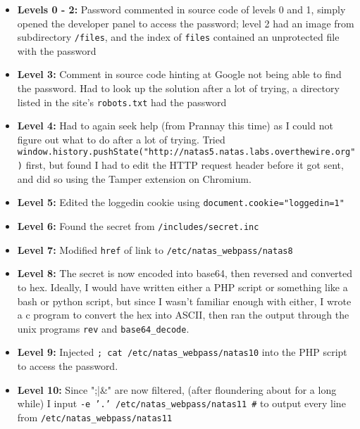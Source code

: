 \documentclass{article}
\def\code#1{\texttt{#1}}
\begin{document}
\begin{itemize}
    
    \item \textbf{Levels 0 - 2: } Password commented in source code of levels 0 and 1, simply opened the developer panel to access the password; level 2 had an image from subdirectory \code{/files}, and the index of \code{files} contained an unprotected file with the password
    
    \item \textbf{Level 3: } Comment in source code hinting at Google not being able to find the password. Had to look up the solution after a lot of trying, a directory listed in the site's \code{robots.txt} had the password
    
    \item \textbf{Level 4: } Had to again seek help (from Prannay this time) as I could not figure out what to do after a lot of trying. Tried \code{window.history.pushState("http://natas5.natas.labs.overthewire.org")} first, but found I had to edit the HTTP request header before it got sent, and did so using the Tamper extension on Chromium.
    
    \item \textbf{Level 5: } Edited the loggedin cookie using \code{document.cookie="loggedin=1"}
    
    \item \textbf{Level 6: } Found the secret from \code{/includes/secret.inc}
    
    \item \textbf{Level 7: } Modified \code{href} of link to \code{/etc/natas_webpass/natas8}
    
    \item \textbf{Level 8: } The secret is now encoded into base64, then reversed and converted to hex. Ideally, I would have written either a PHP script or something like a bash or python script, but since I wasn't familiar enough with either, I wrote a c program to convert the hex into ASCII, then ran the output through the unix programs \code{rev} and \code{base64_decode}.
    
    \item \textbf{Level 9: } Injected \code{; cat /etc/natas_webpass/natas10} into the PHP script to access the password.
    
    \item \textbf{Level 10: } Since ";|&" are now filtered, (after floundering about for a long while) I input \code{-e '.' /etc/natas_webpass/natas11 #} to output every line from \code{/etc/natas_webpass/natas11}
    
\end{itemize}
\end{document}
